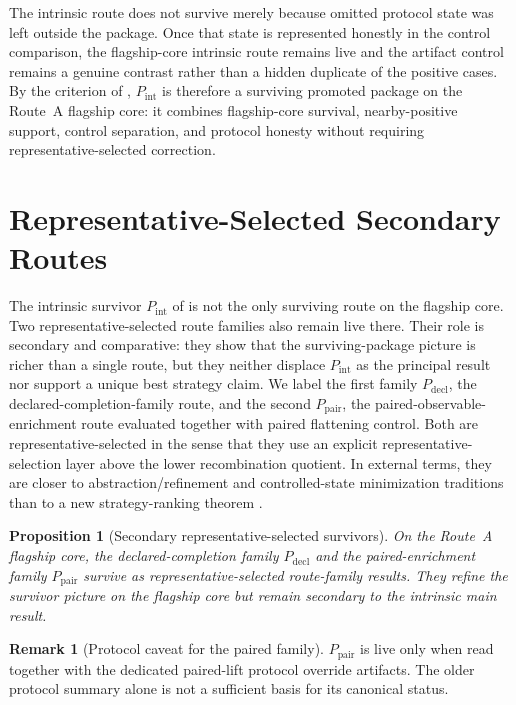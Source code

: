 \documentclass[11pt]{article}
\newtheorem{proposition}[theorem]{Proposition}
\theoremstyle{definition}
\newtheorem{remark}[theorem]{Remark}
\begin{document}
The intrinsic route does not survive merely because omitted protocol state was left outside the package. Once that state is represented honestly in the control comparison, the flagship-core intrinsic route remains live and the artifact control remains a genuine contrast rather than a hidden duplicate of the positive cases. By the criterion of , $P_{\mathrm{int}}$ is therefore a surviving promoted package on the Route~A flagship core: it combines flagship-core survival, nearby-positive support, control separation, and protocol honesty without requiring representative-selected correction.
 \section{Representative-Selected Secondary Routes}\label{sec:lift}

The intrinsic survivor $P_{\mathrm{int}}$ of  is not the only surviving route on the flagship core. Two representative-selected route families also remain live there. Their role is secondary and comparative: they show that the surviving-package picture is richer than a single route, but they neither displace $P_{\mathrm{int}}$ as the principal result nor support a unique best strategy claim. We label the first family $P_{\mathrm{decl}}$, the declared-completion-family route, and the second $P_{\mathrm{pair}}$, the paired-observable-enrichment route evaluated together with paired flattening control. Both are representative-selected in the sense that they use an explicit representative-selection layer above the lower recombination quotient. In external terms, they are closer to abstraction/refinement and controlled-state minimization traditions than to a new strategy-ranking theorem \citep{CousotCousot1977,DeanGivan1997,GivanDeanGreig2003,LiWalshLittman2006}.

\begin{proposition}[Secondary representative-selected survivors]\label{prop:secondary-lift-survivors}
On the Route~A flagship core, the declared-completion family $P_{\mathrm{decl}}$ and the paired-enrichment family $P_{\mathrm{pair}}$ survive as representative-selected route-family results. They refine the survivor picture on the flagship core but remain secondary to the intrinsic main result.
\end{proposition}

\begin{remark}[Protocol caveat for the paired family]\label{rem:paired-family-caveat}
$P_{\mathrm{pair}}$ is live only when read together with the dedicated paired-lift protocol override artifacts. The older protocol summary alone is not a sufficient basis for its canonical status.
\end{remark}
\end{document}
